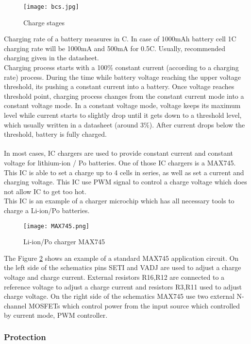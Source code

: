 \begin{figure}[h]
	\centering
	\texttt{[image: bcs.jpg]}
	\caption{ Charge stages \cite{14}}
	\label{fig: bcs}
\end{figure}
 Charging rate of a battery measures in C. In case of 1000mAh battery cell 1C charging rate will be 1000mA and 500mA for 0.5C. Usually, recommended charging given in the datasheet.\\
 Charging process starts with a 100\%  constant current (according to a charging rate) process. During the time while battery voltage reaching the upper voltage threshold, its pushing a constant current into a battery. Once voltage reaches threshold point, charging process changes from the constant current mode into a constant voltage mode. In a constant voltage mode, voltage keeps its maximum level while current starts to slightly drop until it gets down to a threshold level, which usually written in a datasheet (around 3\%). After current drops below the threshold, battery is fully charged. \\ \\
 In most cases, IC chargers are used to provide constant current and constant voltage for lithium-ion / Po batteries. \cite{14} One of those IC chargers is a MAX745. 
This IC is able to set a charge up to 4 cells in series, as well as set a current and charging voltage. This IC use PWM signal to control a charge voltage which does not allow IC to get too hot.\\ This IC is an example of a charger microchip which has all necessary  tools to charge a Li-ion/Po batteries. 



\begin{figure}[h]
	\centering
	\texttt{[image: MAX745.png]}
	\caption{ Li-ion/Po charger MAX745 \cite{15}}
	\label{fig: EPS22}
\end{figure}

The Figure \ref{fig: EPS22} shows an example of a standard MAX745 application circuit. On the left side of the schematics pins SETI and VADJ are used to adjust a charge voltage and charge current. External resistors R16,R12 are connected to a reference voltage to adjust a charge current and resistors R3,R11  used to adjust charge voltage. On the right side of the schematics MAX745 use two external N-channel MOSFETs which control power from the input source which controlled by current mode, PWM controller. 



\subsubsection{Protection}

